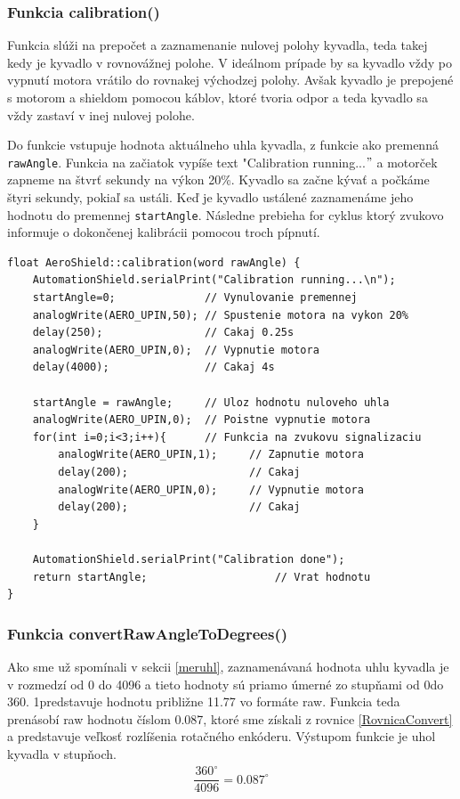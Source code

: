 \subsubsection{Funkcia calibration()}

Funkcia  slúži na prepočet a zaznamenanie nulovej polohy kyvadla, teda takej kedy je kyvadlo v rovnovážnej polohe. V ideálnom prípade by sa kyvadlo vždy po vypnutí motora vrátilo do rovnakej východzej polohy. Avšak kyvadlo je prepojené s motorom a shieldom pomocou káblov, ktoré tvoria odpor a teda kyvadlo sa vždy zastaví v inej nulovej polohe. 

Do funkcie vstupuje hodnota aktuálneho uhla kyvadla, z funkcie  ako premenná \verb|rawAngle|. Funkcia na začiatok vypíše text "Calibration running...$"$ a motorček zapneme na štvrť sekundy na výkon 20\%. Kyvadlo sa začne kývať a počkáme štyri sekundy, pokiaľ sa ustáli. Keď je kyvadlo ustálené zaznamenáme jeho hodnotu do premennej \verb|startAngle|. Následne prebieha for cyklus ktorý zvukovo informuje o dokončenej kalibrácii pomocou troch pípnutí. 

\begin{lstlisting}[caption={Zdrojový kód funkcie calibration.},captionpos=b]
float AeroShield::calibration(word rawAngle) {  
	AutomationShield.serialPrint("Calibration running...\n");  
	startAngle=0;              // Vynulovanie premennej 
	analogWrite(AERO_UPIN,50); // Spustenie motora na vykon 20%
	delay(250);                // Cakaj 0.25s 
	analogWrite(AERO_UPIN,0);  // Vypnutie motora
	delay(4000);               // Cakaj 4s
	
	startAngle = rawAngle;     // Uloz hodnotu nuloveho uhla
	analogWrite(AERO_UPIN,0);  // Poistne vypnutie motora 
	for(int i=0;i<3;i++){      // Funkcia na zvukovu signalizaciu
		analogWrite(AERO_UPIN,1);     // Zapnutie motora
		delay(200);                   // Cakaj
		analogWrite(AERO_UPIN,0);     // Vypnutie motora
		delay(200);                   // Cakaj
	}
	
	AutomationShield.serialPrint("Calibration done");
	return startAngle;                    // Vrat hodnotu 
}
\end{lstlisting}

\subsubsection{Funkcia convertRawAngleToDegrees()}

Ako sme už spomínali v sekcii \ref{meruhl}, zaznamenávaná hodnota uhlu kyvadla je v rozmedzí od 0 do 4096 a tieto hodnoty sú priamo úmerné zo stupňami od 0\textdegree  do 360\textdegree. 1\textdegree   predstavuje hodnotu približne 11.77 vo formáte raw. Funkcia teda prenásobí raw hodnotu číslom 0.087\textdegree, ktoré sme získali z rovnice \ref{RovnicaConvert} a predstavuje veľkosť rozlíšenia rotačného enkóderu. Výstupom funkcie je uhol kyvadla v stupňoch.
 \begin{align}
 	\label{RovnicaConvert}
 	  \dfrac{360^{\circ}}{4096} = 0.087^{\circ}
 \end{align}


